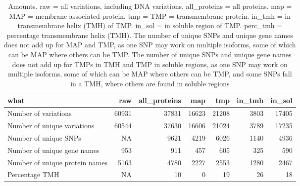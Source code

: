 \begin{table}

\caption{\label{tab:ncbi_counts}Amounts. raw = all variations, including DNA variations. all\_proteins = all proteins. map = MAP = membrane associated protein. tmp = TMP = transmembrane protein. in\_tmh = in transmembrane helix (TMH) of TMP. in\_sol = in soluble region of TMP. perc\_tmh = percentage transmembrane helix (TMH). The number of unique SNPs and unique gene names does not add up for MAP and TMP, as one SNP may work on multiple isoforms, some of which can be MAP where others can be TMP. The number of unique SNPs and unique gene names does not add up for TMPs in TMH and TMP in soluble regions, as one SNP may work on multiple isoforms, some of which can be MAP where others can be TMP, and some SNPs fall in a TMH, where others are found in soluble regions}
\centering
\begin{tabular}[t]{l|r|r|r|r|r|r}
\hline
what & raw & all\_proteins & map & tmp & in\_tmh & in\_sol\\
\hline
Number of variations & 60931 & 37831 & 16623 & 21208 & 3803 & 17405\\
\hline
Number of unique variations & 60544 & 37630 & 16606 & 21024 & 3789 & 17235\\
\hline
Number of unique SNPs & NA & 9621 & 4219 & 6026 & 1140 & 4936\\
\hline
Number of unique gene names & 953 & 911 & 457 & 605 & 325 & 590\\
\hline
Number of unique protein names & 5163 & 4780 & 2227 & 2553 & 1280 & 2467\\
\hline
Percentage TMH & NA & 10 & 0 & 19 & 26 & 18\\
\hline
\end{tabular}
\end{table}